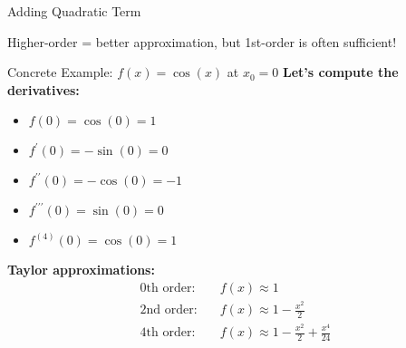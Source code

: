 \documentclass[usenames,dvipsnames]{beamer}
\begin{document}
  \begin{frame}{Adding Quadratic Term}
    \begin{center}
    \end{center}

    \begin{keypointsbox}{}
    Higher-order = better approximation, but 1st-order is often sufficient!
    \end{keypointsbox}
  \end{frame}

  \begin{frame}{Concrete Example: $f(x) = \cos(x)$ at $x_0 = 0$}
    \textbf{Let's compute the derivatives:}
    \begin{itemize}[<+->]
        \item $f(0) = \cos(0) = 1$
        \item $f^{\prime}(0) = -\sin(0) = 0$
        \item $f^{\prime\prime}(0) = -\cos(0) = -1$
        \item $f^{\prime\prime\prime}(0) = \sin(0) = 0$
        \item $f^{(4)}(0) = \cos(0) = 1$
    \end{itemize}
    
    \pause
    \textbf{Taylor approximations:}
    \begin{align}
        \text{0th order:} \quad &f(x) \approx 1\\
        \text{2nd order:} \quad &f(x) \approx 1 - \frac{x^2}{2}\\
        \text{4th order:} \quad &f(x) \approx 1 - \frac{x^2}{2} + \frac{x^4}{24}
    \end{align}
  \end{frame}
\end{document}
